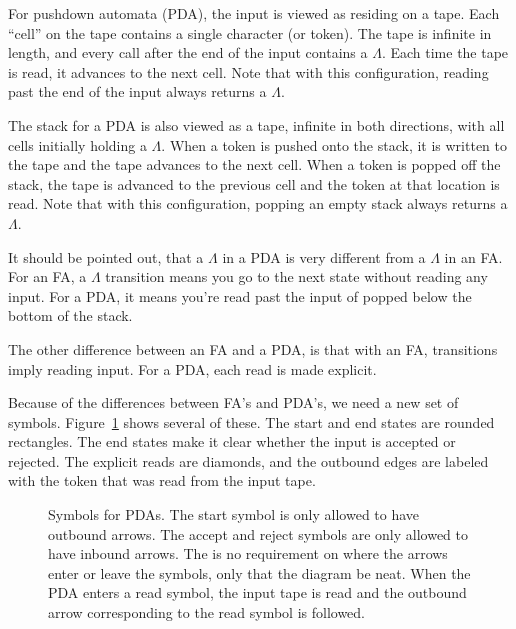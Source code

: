 \documentclass[letterpaper,12pt,openany,reqno]{book}%
\newcommand{\pdaterminal}[3] {\node at (#1) (#2) [rectangle, draw, rounded corners] {#3};}
\newcommand{\pdaread}[3] {\node at (#1) (#2) [diamond, draw] {#3}; }
\newcommand{\pdatransition}[3] {\draw [->] (#1) -- (#2) node [midway, above] {#3};}
\newcommand{\pdarighttransition}[3] {\draw [->] (#1) -- (#2) node [midway, right] {#3};}
\begin{document}
For pushdown automata (PDA), the input is viewed as residing on a tape. Each ``cell'' on the tape contains a single character (or token). The tape is infinite in length, and every call after the end of the input contains a $\Lambda$. Each time the tape is read, it advances to the next cell. Note that with this configuration, reading past the end of the input always returns a $\Lambda$.

The stack for a PDA is also viewed as a tape, infinite in both directions, with all cells initially holding a $\Lambda$. When a token is pushed onto the stack, it is written to the tape and the tape advances to the next cell. When a token is popped off the stack, the tape is advanced to the previous cell and the token at that location is read. Note that with this configuration, popping an empty stack always returns a $\Lambda$.

It should be pointed out, that a $\Lambda$ in a PDA is very different from a $\Lambda$ in an FA. For an FA, a $\Lambda$ transition means you go to the next state without reading any input. For a PDA, it means you're read past the input of popped below the bottom of the stack.

The other difference between an FA and a PDA, is that with an FA, transitions imply reading input. For a PDA, each read is made explicit.

Because of the differences between FA's and PDA's, we need a new set of symbols. Figure~\ref{F.pda.symbols} shows several of these. The start and end states are rounded rectangles. The end states make it clear whether the input is accepted or rejected. The explicit reads are diamonds, and the outbound edges are labeled with the token that was read from the input tape.

\begin{figure}[hbt]
\centering
{}

\caption[Symbols for PDAs]{Symbols for PDAs. The start symbol is only allowed to have outbound arrows. The accept and reject symbols are only allowed to have inbound arrows. The is no requirement on where the arrows enter or leave the symbols, only that the diagram be neat. When the PDA enters a read symbol, the input tape is read and the outbound arrow corresponding to the read symbol is followed.}
\label{F.pda.symbols}
\end{figure}
\end{document}
